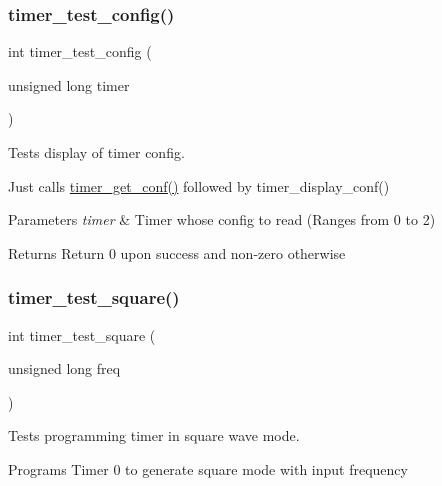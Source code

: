 \subsubsection{\texorpdfstring{timer\+\_\+test\+\_\+config()}{timer\_test\_config()}}
{\footnotesize\ttfamily int timer\+\_\+test\+\_\+config (\begin{DoxyParamCaption}\item[{unsigned long}]{timer }\end{DoxyParamCaption})}



Tests display of timer config. 

Just calls \hyperlink{group__timer_ga8eb3357bc05265afc4bea5bbbb480a53}{timer\+\_\+get\+\_\+conf()} followed by timer\+\_\+display\+\_\+conf()


\begin{DoxyParams}{Parameters}
{\em timer} & Timer whose config to read (Ranges from 0 to 2) \\
\hline
\end{DoxyParams}
\begin{DoxyReturn}{Returns}
Return 0 upon success and non-\/zero otherwise 
\end{DoxyReturn}
\hypertarget{group__timer_ga2e596aede5a7bfc4a6f4382779bf0d7d}{}\label{group__timer_ga2e596aede5a7bfc4a6f4382779bf0d7d} 
\subsubsection{\texorpdfstring{timer\+\_\+test\+\_\+square()}{timer\_test\_square()}}
{\footnotesize\ttfamily int timer\+\_\+test\+\_\+square (\begin{DoxyParamCaption}\item[{unsigned long}]{freq }\end{DoxyParamCaption})}



Tests programming timer in square wave mode. 

Programs Timer 0 to generate square mode with input frequency


